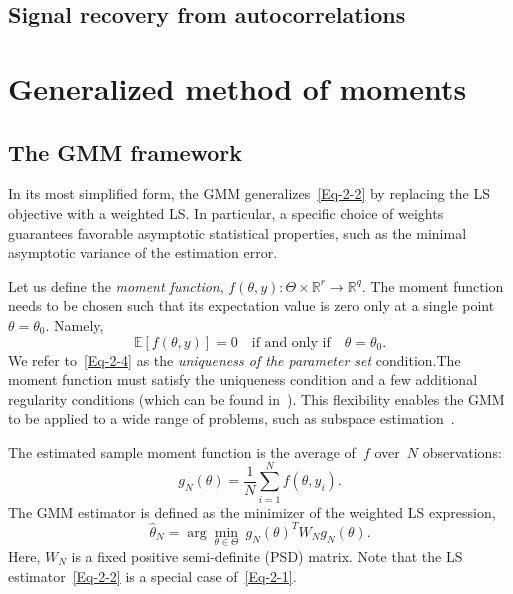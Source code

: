 \documentclass{article}
\newcommand{\asaf}[1]{{\color{blue}{#1}}}
\newcommand{\E}[0]{\mathbb{E}}
\newcommand{\R}[0]{\mathbb{R}}
\begin{document}
\subsection{Signal recovery from autocorrelations}

\section{Generalized method of moments}
\label{gmm}
\subsection{The GMM framework}\label{gmm:framwork}

In its most simplified form, the GMM generalizes~\eqref{Eq-2-2} by replacing the LS objective with a weighted LS. In particular, a specific choice of weights guarantees favorable asymptotic statistical properties, such as {the} minimal asymptotic variance of the estimation error.

Let us define the \textit{moment function}, $f(\theta, y)\colon \Theta \times \R^r \to \R^q$. The moment function needs to be chosen such that its expectation value is zero only at a single point $\theta=\theta_0$. Namely,
\begin{equation}\label{Eq-2-4}
	\E\left[f(\theta,y)\right] = 0 \quad \text{if and only if} \quad \theta = \theta_0.
\end{equation}
We refer to~\eqref{Eq-2-4} as the \textit{uniqueness of the parameter set} condition.The moment function must satisfy the uniqueness condition and a few additional regularity conditions (which can be found in~\cite{Hansen1982, abas2021generalized}). This flexibility enables the GMM to be applied to a wide range of problems, such as subspace estimation~\cite{Fan2018}.

\asaf{TODO: Define the moment function}

The estimated sample moment function is the average of~$f$ over~$N$ observations:
\begin{equation}\label{Eq-2-5}
	g_N(\theta) = \frac{1}{N} \sum_{i=1}^N f(\theta, y_i).
\end{equation}
The GMM estimator is defined as the minimizer of the weighted LS expression,
\begin{equation} \label{Eq-2-1}
	\hat{\theta}_N = \arg\min_{\theta \in \Theta} \ g_N(\theta)^T W_N g_N(\theta).
\end{equation}
Here, $W_N$ is a fixed positive semi-definite (PSD) matrix. Note that the LS estimator~\eqref{Eq-2-2} is a special case of~\eqref{Eq-2-1}.
\end{document}
